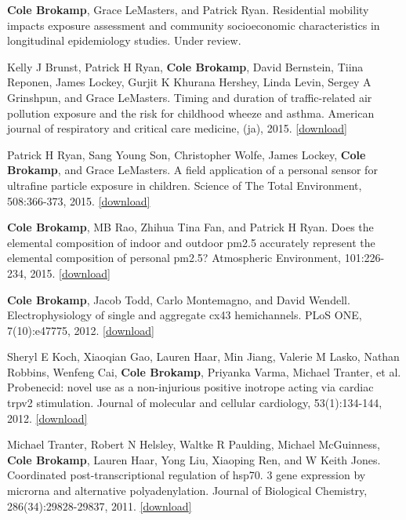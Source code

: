 
\textbf{Cole Brokamp}, Grace LeMasters, and Patrick Ryan. Residential
mobility impacts exposure assessment and community socioeconomic
characteristics in longitudinal epidemiology studies. Under review.

Kelly J Brunst, Patrick H Ryan, \textbf{Cole Brokamp}, David Bernstein,
Tiina Reponen, James Lockey, Gurjit K Khurana Hershey, Linda Levin,
Sergey A Grinshpun, and Grace LeMasters. Timing and duration of
traffic-related air pollution exposure and the risk for childhood wheeze
and asthma. American journal of respiratory and critical care medicine,
(ja), 2015.
\href{https://github.com/cole-brokamp/cole-brokamp.github.io/raw/master/publications/rccm\%252E201407-1314oc.pdf}{{[}download{]}}

Patrick H Ryan, Sang Young Son, Christopher Wolfe, James Lockey,
\textbf{Cole Brokamp}, and Grace LeMasters. A field application of a
personal sensor for ultrafine particle exposure in children. Science of
The Total Environment, 508:366-373, 2015.
\href{https://github.com/cole-brokamp/cole-brokamp.github.io/raw/master/publications/1-s2.0-S0048969714016556-main.pdf}{{[}download{]}}

\textbf{Cole Brokamp}, MB Rao, Zhihua Tina Fan, and Patrick H Ryan. Does
the elemental composition of indoor and outdoor pm2.5 accurately
represent the elemental composition of personal pm2.5? Atmospheric
Environment, 101:226-234, 2015.
\href{https://github.com/cole-brokamp/cole-brokamp.github.io/raw/master/publications/1-s2.0-S1352231014008814-main.pdf}{{[}download{]}}

\textbf{Cole Brokamp}, Jacob Todd, Carlo Montemagno, and David Wendell.
Electrophysiology of single and aggregate cx43 hemichannels. PLoS ONE,
7(10):e47775, 2012.
\href{https://github.com/cole-brokamp/cole-brokamp.github.io/raw/master/publications/journal.pone.0047775.pdf}{{[}download{]}}

Sheryl E Koch, Xiaoqian Gao, Lauren Haar, Min Jiang, Valerie M Lasko,
Nathan Robbins, Wenfeng Cai, \textbf{Cole Brokamp}, Priyanka Varma,
Michael Tranter, et al. Probenecid: novel use as a non-injurious
positive inotrope acting via cardiac trpv2 stimulation. Journal of
molecular and cellular cardiology, 53(1):134-144, 2012.
\href{https://github.com/cole-brokamp/cole-brokamp.github.io/raw/master/publications/nihms-373871.pdf}{{[}download{]}}

Michael Tranter, Robert N Helsley, Waltke R Paulding, Michael
McGuinness, \textbf{Cole Brokamp}, Lauren Haar, Yong Liu, Xiaoping Ren,
and W Keith Jones. Coordinated post-transcriptional regulation of hsp70.
3 gene expression by microrna and alternative polyadenylation. Journal
of Biological Chemistry, 286(34):29828-29837, 2011.
\href{https://github.com/cole-brokamp/cole-brokamp.github.io/raw/master/publications/J.\%20Biol.\%20Chem.-2011-Tranter-29828-37.pdf}{{[}download{]}}

